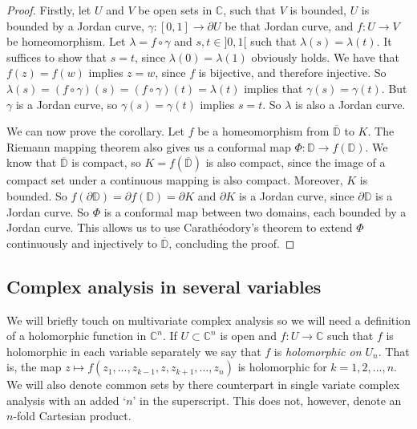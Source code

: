 \documentclass[a4paper,12pt,twoside,BCOR=10mm]{scrbook}
\theoremstyle{definition}
\theoremstyle{definition}
\theoremstyle{definition}
\begin{document}
\begin{proof}

Firstly, let
	$U$ and $V$ be open sets in $\mathbb{C}$,
	such that $V$ is bounded,
	$U$ is bounded by a Jordan curve,
	$\gamma: [0, 1] \rightarrow \partial U$ be that Jordan curve,
	and $f: U \rightarrow V$ be homeomorphism.
Let $\lambda = f \circ \gamma$ and $s, t \in ]0, 1[$ such that $\lambda(s) = \lambda(t)$.
It suffices to show that $s = t$, since $\lambda(0) = \lambda(1)$ obviously holds.
We have that $f(z) = f(w)$ implies $z = w$, since $f$ is bijective, and therefore injective.
So $\lambda(s) = (f \circ \gamma)(s) = (f \circ \gamma)(t) = \lambda(t)$ implies that $\gamma(s) = \gamma(t)$.
But $\gamma$ is a Jordan curve, so $\gamma(s) = \gamma(t)$ implies $s = t$.
So $\lambda$ is also a Jordan curve. 

We can now prove the corollary.
Let $f$ be a homeomorphism from $\overline{\mathbb{D}}$ to $K$.
The Riemann mapping theorem also gives us a conformal map $\Phi: \mathbb{D} \rightarrow f(\mathbb{D})$.
We know that $\overline{\mathbb{D}}$ is compact, so $K = f(\overline{\mathbb{D}})$ is also compact, since the image of a compact set under a continuous mapping is also compact.
Moreover, $K$ is bounded.
So $f(\partial \mathbb{D}) = \partial f(\mathbb{D}) = \partial K$ and $\partial K$ is a Jordan curve, since $\partial \mathbb{D}$ is a Jordan curve.
So $\Phi$ is a conformal map between two domains, each bounded by a Jordan curve.
This allows us to use Carathéodory's theorem to extend $\Phi$ continuously and injectively to $\overline{\mathbb{D}}$, concluding the proof.
\end{proof}

\subsection{Complex analysis in several variables}
\label{index9}
We will briefly touch on multivariate complex analysis so we will need a definition of a holomorphic function in $\mathbb{C}^n$.
If $U \subset \mathbb{C}^n$ is open and $f: U \rightarrow \mathbb{C}$ such that $f$ is holomorphic in each variable separately we say that $f$ is \emph{holomorphic on $U_n$}.
That is, the map $z \mapsto f(z_1, ..., z_{k - 1}, z, z_{k + 1}, ..., z_n)$ is holomorphic for $k = 1, 2, ..., n$.
We will also denote common sets by there counterpart in single variate complex analysis with an added `$n$' in the superscript.
This does not, however, denote an $n$-fold Cartesian product.
\end{document}
